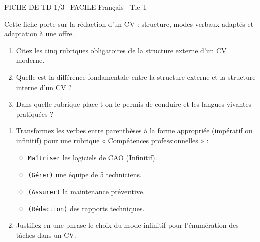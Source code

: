 \documentclass[11pt]{article}
\begin{document}
\begin{tcolorbox}[enhanced,colback=popink,colframe=popink,arc=10pt,boxrule=0pt,left=12pt,right=12pt,top=9pt,bottom=9pt]
{\color{white}\popxbold\small FICHE DE TD 1/3 \textbullet\ FACILE \hfill Français \textbullet\ Tle T\par}
\end{tcolorbox}
\vspace{4pt}
Cette fiche porte sur la rédaction d'un CV : structure, modes verbaux adaptés et adaptation à une offre.

\begin{exercice}
\begin{enumerate}
    \item Citez les cinq rubriques obligatoires de la structure externe d'un CV moderne.
    \item Quelle est la différence fondamentale entre la structure externe et la structure interne d'un CV ?
    \item Dans quelle rubrique place-t-on le permis de conduire et les langues vivantes pratiquées ?
\end{enumerate}
\end{exercice}

\begin{exercice}
\begin{enumerate}
    \item Transformez les verbes entre parenthèses à la forme appropriée (impératif ou infinitif) pour une rubrique « Compétences professionnelles » :
    \begin{itemize}
        \item \texttt{Maîtriser} les logiciels de CAO (Infinitif).
        \item \texttt{(Gérer)} une équipe de 5 techniciens.
        \item \texttt{(Assurer)} la maintenance préventive.
        \item \texttt{(Rédaction)} des rapports techniques.
    \end{itemize}
    \item Justifiez en une phrase le choix du mode infinitif pour l'énumération des tâches dans un CV.
\end{enumerate}
\end{exercice}
\end{document}

